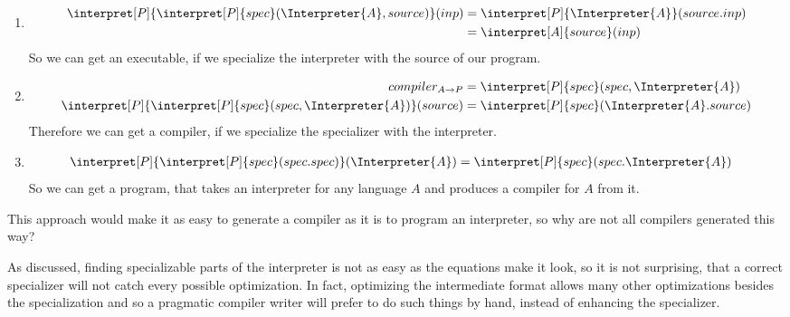 \begin{enumerate}
	\item \begin{align*}
			\interpret[P]{\interpret[P]{spec}(\Interpreter{A}, source)}(inp)
			&= \interpret[P]{\Interpreter{A}}(source.inp) \\
			&= \interpret[A]{source}(inp)
	\end{align*}
		So we can get an executable, if we specialize the interpreter with the 
		source of our program.
	\item \begin{equation*}
			\begin{split}
			compiler_{A\rightarrow P} &= \interpret[P]{spec}(spec, \Interpreter{A}) \\
				\interpret[P]{\interpret[P]{spec}(spec, \Interpreter{A})}(source)
				&= \interpret[P]{spec}(\Interpreter{A}.source)
		\end{split}
	\end{equation*}
		Therefore we can get a compiler, if we specialize the specializer with the interpreter.
	\item \begin{align*}
			\interpret[P]{\interpret[P]{spec}(spec.spec)}(\Interpreter{A})
			&= \interpret[P]{spec}(spec.\Interpreter{A})
	\end{align*}
		So we can get a program, that takes an interpreter for any language $A$ 
		and produces a compiler for $A$ from it.
\end{enumerate}

This approach would make it as easy to generate a compiler as it is to 
program an interpreter, so why are not all compilers generated this way?

As discussed, finding specializable parts of the interpreter is not as easy 
as the equations make it look, so it is not surprising, that a correct 
specializer will not catch every possible optimization. In fact, optimizing 
the intermediate format allows many other optimizations besides the
specialization and so a pragmatic compiler writer will prefer to do such 
things by hand, instead of enhancing the specializer.

